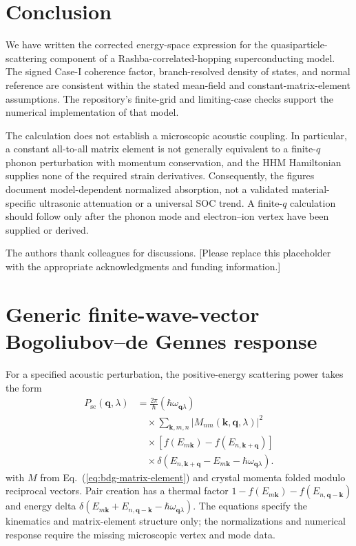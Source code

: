 \documentclass[aps,prb,reprint,superscriptaddress]{revtex4-2}
\begin{document}
\section{Conclusion}

We have written the corrected energy-space expression for the quasiparticle-scattering component of a Rashba-correlated-hopping superconducting model. The signed Case-I coherence factor, branch-resolved density of states, and normal reference are consistent within the stated mean-field and constant-matrix-element assumptions. The repository's finite-grid and limiting-case checks support the numerical implementation of that model.

The calculation does not establish a microscopic acoustic coupling. In particular, a constant all-to-all matrix element is not generally equivalent to a finite-$q$ phonon perturbation with momentum conservation, and the HHM Hamiltonian supplies none of the required strain derivatives. Consequently, the figures document model-dependent normalized absorption, not a validated material-specific ultrasonic attenuation or a universal SOC trend. A finite-$q$ calculation should follow only after the phonon mode and electron--ion vertex have been supplied or derived.

\begin{acknowledgments}
The authors thank colleagues for discussions. [Please replace this placeholder with the appropriate acknowledgments and funding information.]
\end{acknowledgments}

\appendix
\section{Generic finite-wave-vector Bogoliubov--de Gennes response}

For a specified acoustic perturbation, the positive-energy scattering power takes the form
\begin{equation}
\begin{aligned}
 P_{\mathrm{sc}}(\bm q,\lambda)&=\frac{2\pi}{\hbar}(\hbar\omega_{\bm q\lambda})\\
 &\quad\times\sum_{\bm k,m,n}|M_{nm}(\bm k,\bm q,\lambda)|^2\\
 &\quad\times[f(E_{m\bm k})-f(E_{n,\bm{k+q}})]\\
 &\quad\times\delta(E_{n,\bm{k+q}}-E_{m\bm k}-\hbar\omega_{\bm q\lambda}).
\end{aligned}
\label{eq:finiteq-sc}
\end{equation}
with $M$ from Eq.~(\ref{eq:bdg-matrix-element}) and crystal momenta folded modulo reciprocal vectors. Pair creation has a thermal factor $1-f(E_{m\bm k})-f(E_{n,\bm{q-k}})$ and energy delta $\delta(E_{m\bm k}+E_{n,\bm{q-k}}-\hbar\omega_{\bm q\lambda})$. The equations specify the kinematics and matrix-element structure only; the normalizations and numerical response require the missing microscopic vertex and mode data.
\end{document}
